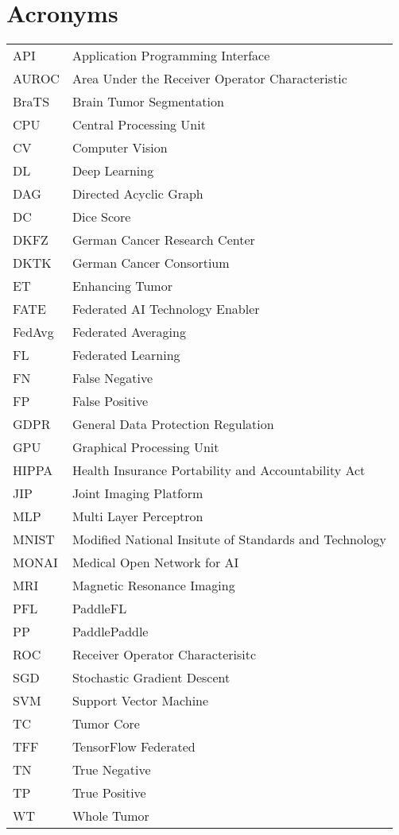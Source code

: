 \section*{Acronyms}
\begin{table}[H]
    \begin{tabular}{p{4cm} p{10cm}}
     API    & Application Programming Interface \\
     AUROC  & Area Under the Receiver Operator Characteristic \\
     BraTS  & Brain Tumor Segmentation \\
     CPU    & Central Processing Unit \\
     CV     & Computer Vision \\
     DL     & Deep Learning \\
     DAG    & Directed Acyclic Graph \\
     DC     & Dice Score \\
     DKFZ   & German Cancer Research Center \\
     DKTK   & German Cancer Consortium \\
     ET     & Enhancing Tumor \\
     FATE   & Federated AI Technology Enabler \\
     FedAvg & Federated Averaging \\
     FL     & Federated Learning \\
     FN     & False Negative \\
     FP     & False Positive \\
     GDPR   & General Data Protection Regulation \\
     GPU    & Graphical Processing Unit \\
     HIPPA  & Health Insurance Portability and Accountability Act \\
     JIP    & Joint Imaging Platform \\
     MLP    & Multi Layer Perceptron \\
     MNIST  & Modified National Insitute of Standards and Technology \\
     MONAI  & Medical Open Network for AI \\
     MRI    & Magnetic Resonance Imaging \\
     PFL    & PaddleFL \\
     PP     & PaddlePaddle \\
     ROC    & Receiver Operator Characterisitc \\
     SGD    & Stochastic Gradient Descent \\
     SVM    & Support Vector Machine \\
     TC     & Tumor Core \\
     TFF    & TensorFlow Federated \\
     TN     & True Negative \\
     TP     & True Positive \\
     WT     & Whole Tumor
    \end{tabular}%
\end{table}%

